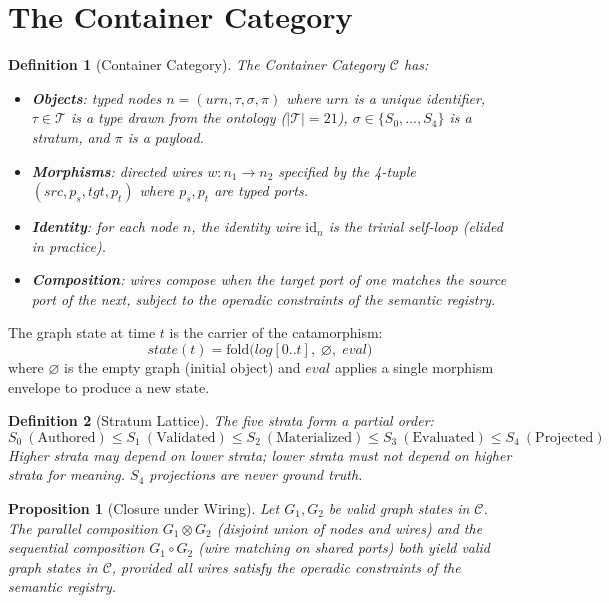 \documentclass[submission,copyright,creativecommons]{eptcs}
\newtheorem{definition}{Definition}
\newtheorem{proposition}{Proposition}
\begin{document}
\section{The Container Category}
\label{sec:container}

\begin{definition}[Container Category]
The \emph{Container Category} $\mathcal{C}$ has:
\begin{itemize}
  \item \textbf{Objects}: typed nodes $n = (\mathit{urn}, \tau, \sigma, \pi)$
        where $\mathit{urn}$ is a unique identifier, $\tau \in \mathcal{T}$ is
        a type drawn from the ontology ($|\mathcal{T}| = 21$), $\sigma \in
        \{S_0, \ldots, S_4\}$ is a stratum, and $\pi$ is a payload.
  \item \textbf{Morphisms}: directed wires $w\colon n_1 \to n_2$ specified by
        the 4-tuple $(\mathit{src}, p_s, \mathit{tgt}, p_t)$ where $p_s, p_t$
        are typed ports.
  \item \textbf{Identity}: for each node $n$, the identity wire
        $\mathrm{id}_n$ is the trivial self-loop (elided in practice).
  \item \textbf{Composition}: wires compose when the target port of one matches
        the source port of the next, subject to the operadic constraints of
        the semantic registry.
\end{itemize}
\end{definition}

The graph state at time $t$ is the carrier of the catamorphism:
\begin{equation}
\label{eq:cata}
\mathit{state}(t) = \mathrm{fold}\bigl(\mathit{log}[0..t],\; \varnothing,\;
\mathit{eval}\bigr)
\end{equation}
where $\varnothing$ is the empty graph (initial object) and $\mathit{eval}$
applies a single morphism envelope to produce a new state.

\begin{definition}[Stratum Lattice]
The five strata form a partial order:
\[
S_0\ (\text{Authored}) \leq S_1\ (\text{Validated}) \leq S_2\
(\text{Materialized}) \leq S_3\ (\text{Evaluated}) \leq S_4\ (\text{Projected})
\]
Higher strata may depend on lower strata; lower strata must not depend on
higher strata for meaning. $S_4$ projections are never ground truth.
\end{definition}

\begin{proposition}[Closure under Wiring]
\label{prop:closure}
Let $G_1, G_2$ be valid graph states in $\mathcal{C}$. The parallel
composition $G_1 \otimes G_2$ (disjoint union of nodes and wires) and the
sequential composition $G_1 \circ G_2$ (wire matching on shared ports) both
yield valid graph states in $\mathcal{C}$, provided all wires satisfy the
operadic constraints of the semantic registry.
\end{proposition}
\end{document}
